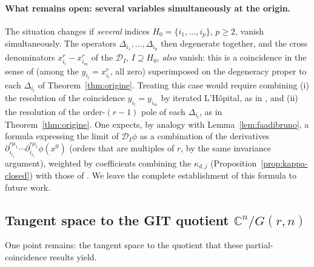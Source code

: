 \documentclass[11pt]{article}
\theoremstyle{remark}
\newcommand{\CC}{\mathbb{C}}
\begin{document}
\paragraph{What remains open: several variables simultaneously at the origin.} The situation changes if \emph{several} indices $H_0=\{i_1,\dots,i_p\}$, $p\ge2$, vanish simultaneously. The operators $\Delta_{i_1},\dots,\Delta_{i_p}$ then degenerate together, and the cross denominators $x_{i_l}^r-x_{i_m}^r$ of the $\mathcal D_I$, $I\supseteq H_0$, \emph{also} vanish: this is a coincidence in the sense of \cite[Theorem~24]{Ze} (among the $y_{i_l}=x_{i_l}^r$, all zero) superimposed on the degeneracy proper to each $\Delta_{i_l}$ of Theorem~\ref{thm:origine}. Treating this case would require combining (i) the resolution of the coincidence $y_{i_l}=y_{i_m}$ by iterated L'Hôpital, as in \cite[Lemmas~26--28]{Ze}, and (ii) the resolution of the order-$(r-1)$ pole of each $\Delta_{i_l}$, as in Theorem~\ref{thm:origine}. One expects, by analogy with Lemma~\ref{lem:faadibruno}, a formula expressing the limit of $\mathcal D_I\phi$ as a combination of the derivatives $\partial_{i_{l_1}}^{r\mu_1}\cdots\partial_{i_{l_t}}^{r\mu_t}\phi(x^0)$ (orders that are multiples of $r$, by the same invariance argument), weighted by coefficients combining the $\kappa_{d,j}$ (Proposition~\ref{prop:kappa-closed}) with those of \cite[Theorem~24]{Ze}. We leave the complete establishment of this formula to future work.

\subsection{Tangent space to the GIT quotient $\CC^n/G(r,n)$}

One point remains: the tangent space to the quotient that these partial-coincidence results yield.
\end{document}
